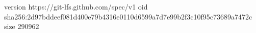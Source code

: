 version https://git-lfs.github.com/spec/v1
oid sha256:2d97bddeef081d400e79b4316e0110d6599a7d7e99b2f3c10f95c73689a7472c
size 290962
